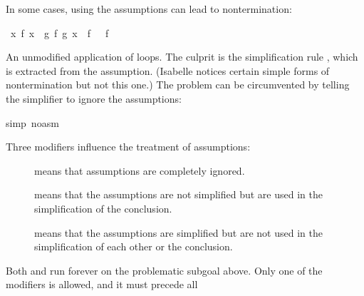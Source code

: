 \begin{isabellebody}
\begin{isamarkuptext}
In some cases, using the assumptions can lead to nontermination:%
\end{isamarkuptext}%
\isamarkuptrue%
\ {\isachardoublequote}{\isasymforall}x{\isachardot}\ f\ x\ {\isacharequal}\ g\ {\isacharparenleft}f\ {\isacharparenleft}g\ x{\isacharparenright}{\isacharparenright}\ {\isasymLongrightarrow}\ f\ {\isacharbrackleft}{\isacharbrackright}\ {\isacharequal}\ f\ {\isacharbrackleft}{\isacharbrackright}\ {\isacharat}\ {\isacharbrackleft}{\isacharbrackright}{\isachardoublequote}\isamarkupfalse%
%
\begin{isamarkuptxt}%
\noindent
An unmodified application of  loops.  The culprit is the
simplification rule , which is extracted from
the assumption.  (Isabelle notices certain simple forms of
nontermination but not this one.)  The problem can be circumvented by
telling the simplifier to ignore the assumptions:%
\end{isamarkuptxt}%
\isamarkuptrue%
simp\ {\isacharparenleft}no{\isacharunderscore}asm{\isacharparenright}{\isacharparenright}\isanewline
\isamarkupfalse%
\isamarkupfalse%
%
\begin{isamarkuptext}%
\noindent
Three modifiers influence the treatment of assumptions:
\begin{description}
\item[]
 means that assumptions are completely ignored.
\item[]
 means that the assumptions are not simplified but
  are used in the simplification of the conclusion.
\item[]
 means that the assumptions are simplified but are not
  used in the simplification of each other or the conclusion.
\end{description}
Both  and  run forever on
the problematic subgoal above.
Only one of the modifiers is allowed, and it must precede all

\end{isamarkuptext}
\end{isabellebody}
